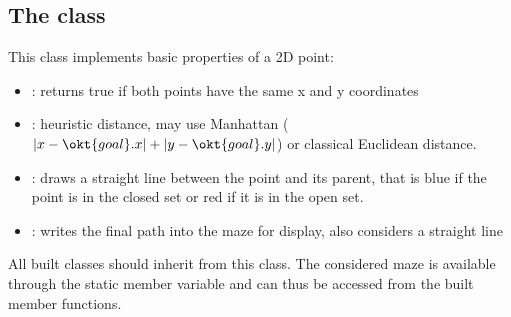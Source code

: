 \documentclass{ecnreport}
\begin{document}
\subsection{The  class}\label{ptClass}

This class implements basic properties of a 2D point:

\begin{itemize}
 \item {}: returns true if both points have the same x and y coordinates
 \item {}: heuristic distance, may use Manhattan
 ($|x-\okt{goal}.x| + |y-\okt{goal}.y|$) or classical Euclidean distance.
 \item {}: draws a straight line between the point and its parent, that
 is blue if the point is in the closed set or red if it is in the open set.
 \item {}: writes the final path into the maze for display, also considers a straight line
\end{itemize}
All built classes should inherit from this class. The considered maze is available through the static member variable  and can thus
be accessed from the built member functions.
\end{document}
